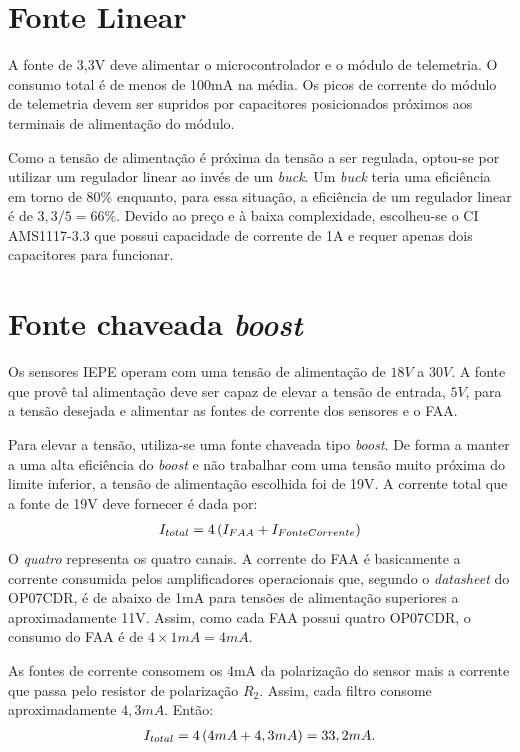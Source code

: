 \documentclass[11pt]{abntex2}
\begin{document}
			\section{Fonte Linear}
				A fonte de 3,3V deve alimentar o microcontrolador e o módulo de
				telemetria. O consumo total é de menos de 100mA na média. Os
				picos de corrente do módulo de telemetria devem ser supridos por
				capacitores posicionados próximos aos terminais de alimentação
				do módulo.

				Como a tensão de alimentação é próxima da tensão a ser regulada,
				optou-se por utilizar um regulador linear ao invés de um
				\textit{buck}. Um \textit{buck} teria uma eficiência em torno de
				80\% enquanto, para essa situação, a eficiência de um regulador
				linear é de $3,3/5 = 66\%$. Devido ao preço e à baixa
				complexidade, escolheu-se o CI AMS1117-3.3 que possui capacidade
				de corrente de 1A e requer apenas dois capacitores para
				funcionar.

			\section{Fonte chaveada \textit{boost}}
				Os sensores IEPE operam com uma tensão de alimentação de $18V$ a
				$30V$. A fonte que provê tal alimentação deve ser capaz de
				elevar a tensão de entrada, $5V$, para a tensão desejada e
				alimentar as fontes de corrente dos sensores e o FAA.
				
				Para elevar a tensão, utiliza-se uma fonte chaveada tipo
				\textit{boost}. De forma a manter a uma alta eficiência do
				\textit{boost} e não trabalhar com uma tensão muito próxima do
				limite inferior, a tensão de alimentação escolhida foi de 19V.
				A corrente total que a fonte de 19V deve fornecer é dada por:
				\begin{gather*}
					I_{total} = 4\* \left(I_{FAA} + I_{FonteCorrente}\right)
				\end{gather*}
				O \textit{quatro} representa os quatro canais. A corrente do FAA
				é basicamente a corrente consumida pelos amplificadores
				operacionais que, segundo o \textit{datasheet} do OP07CDR, é de
				abaixo de 1mA para tensões de alimentação superiores a
				aproximadamente 11V. Assim, como cada FAA possui quatro OP07CDR,
				o consumo do FAA é de $4\times 1mA =  4mA$.

				As fontes de corrente consomem os 4mA da polarização do sensor
				mais a corrente que passa pelo resistor de polarização $R_2$.
				Assim, cada filtro consome aproximadamente $4,3mA$. Então:
				\begin{gather*}
					I_{total} = 4\* \left(4mA + 4,3mA\right) = 33,2mA.
				\end{gather*}
\end{document}
